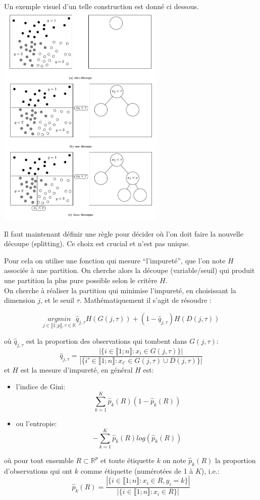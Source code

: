 \documentclass[a4paper]{article}
\theoremstyle{plain}
\begin{document}
Un exemple visuel d’un telle construction est donné ci dessous.\\
\includegraphics[width=8cm]{tree.png}

Il faut maintenant définir une règle pour décider où l’on doit faire la nouvelle découpe (splitting). 
Ce choix est crucial et n’est pas unique. 

Pour cela on utilise une fonction qui mesure “l’impureté”, que l’on
note $H$ associée à une partition. On cherche alors la découpe (variable/seuil) qui produit une partition la plus pure possible selon le critère $H$.\\

On cherche à réaliser la partition qui minimise l'impureté, en choisissant la dimension $j$, et le seuil $\tau$. Mathématiquement il s’agit de résoudre :

$$ \underset{j \in \llbracket 1; p \rrbracket, \tau \in \mathbb{R}}{arg min} \hat q_{j,\tau} H(G(j,\tau)) + (1-\hat q_{j,\tau})H(D(j,\tau))$$

où $ \hat q_{j,\tau} $ est la proportion des observations qui tombent dans $G(j,\tau)$: 
$$
\hat q_{j,\tau} = 
\frac{|\{ i \in  \llbracket 1; n \rrbracket : x_i \in G(j, \tau) \}|}
{|\{ i' \in  \llbracket 1; n \rrbracket : x_{i'} \in G(j, \tau) \cup D(j, \tau) \}|}
$$
et $H$ est la mesure d'impureté, en général $H$ est:
\begin{itemize}
\item l’indice de Gini:
$$ \sum_{k=1}^K \hat p_k (R) (1- \hat p_k(R)) $$
\item ou l'entropie:
$$ - \sum_{k=1}^K \hat p_k(R) log(\hat p_k(R)) $$
\end{itemize}
où pour tout ensemble $ R \subset \mathbb{R}^p$ et toute étiquette $k$ on note $\hat p_k(R)$ la proportion d’observations qui ont $k$ comme étiquette (numérotées de 1 à $K$), i.e.:
$$
\hat p_k(R) = 
\frac{ | \{ i \in \llbracket 1; n \rrbracket : x_i \in R, y_i = k  \} |  }
{| \{ i \in \llbracket 1; n \rrbracket : x_i \in R  \} | } 
$$
\end{document}
